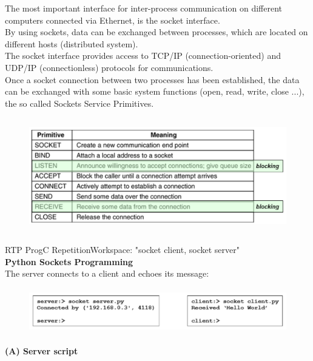 The most important interface for inter-process communication on different computers connected via Ethernet, is the socket interface.\\ 

By using sockets, data can be exchanged between processes, which are located on different hosts (distributed system).\\ 

The socket interface provides access to TCP/IP (connection-oriented) and UDP/IP (connectionless) protocols for communications.\\

Once a socket connection between two processes has been established, the data can be exchanged with some basic system functions (open, read, write, close ...), the so called Sockets Service Primitives.

 	\begin{figure}[h]
    \centering
    \includegraphics[width=12cm, height=5cm]{Images/image195.png}
    \label{fig:Fig 64}
    \end{figure}
    
RTP ProgC RepetitionWorkspace: "socket client, socket server"\\

{\rot \bf Python Sockets Programming}\\

The server connects to a client and echoes its message:

 	\begin{figure}[h]
    \centering
    \includegraphics[width=14cm, height=2cm]{Images/image196.png}
    \label{fig:Fig 64}
    \end{figure}
\nsl{\newpage}

{\bf(A) Server script}\\

